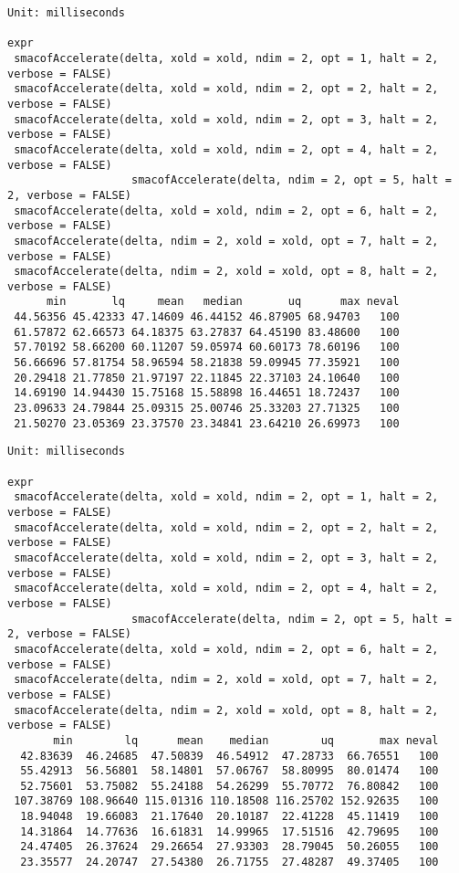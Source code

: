 \documentclass[
  12pt,
  letterpaper,
  DIV=11,
  numbers=noendperiod]{scrartcl}
\begin{document}
\begin{verbatim}
Unit: milliseconds
                                                                                    expr
 smacofAccelerate(delta, xold = xold, ndim = 2, opt = 1, halt = 2,      verbose = FALSE)
 smacofAccelerate(delta, xold = xold, ndim = 2, opt = 2, halt = 2,      verbose = FALSE)
 smacofAccelerate(delta, xold = xold, ndim = 2, opt = 3, halt = 2,      verbose = FALSE)
 smacofAccelerate(delta, xold = xold, ndim = 2, opt = 4, halt = 2,      verbose = FALSE)
                   smacofAccelerate(delta, ndim = 2, opt = 5, halt = 2, verbose = FALSE)
 smacofAccelerate(delta, xold = xold, ndim = 2, opt = 6, halt = 2,      verbose = FALSE)
 smacofAccelerate(delta, ndim = 2, xold = xold, opt = 7, halt = 2,      verbose = FALSE)
 smacofAccelerate(delta, ndim = 2, xold = xold, opt = 8, halt = 2,      verbose = FALSE)
      min       lq     mean   median       uq      max neval
 44.56356 45.42333 47.14609 46.44152 46.87905 68.94703   100
 61.57872 62.66573 64.18375 63.27837 64.45190 83.48600   100
 57.70192 58.66200 60.11207 59.05974 60.60173 78.60196   100
 56.66696 57.81754 58.96594 58.21838 59.09945 77.35921   100
 20.29418 21.77850 21.97197 22.11845 22.37103 24.10640   100
 14.69190 14.94430 15.75168 15.58898 16.44651 18.72437   100
 23.09633 24.79844 25.09315 25.00746 25.33203 27.71325   100
 21.50270 23.05369 23.37570 23.34841 23.64210 26.69973   100
\end{verbatim}

\begin{verbatim}
Unit: milliseconds
                                                                                    expr
 smacofAccelerate(delta, xold = xold, ndim = 2, opt = 1, halt = 2,      verbose = FALSE)
 smacofAccelerate(delta, xold = xold, ndim = 2, opt = 2, halt = 2,      verbose = FALSE)
 smacofAccelerate(delta, xold = xold, ndim = 2, opt = 3, halt = 2,      verbose = FALSE)
 smacofAccelerate(delta, xold = xold, ndim = 2, opt = 4, halt = 2,      verbose = FALSE)
                   smacofAccelerate(delta, ndim = 2, opt = 5, halt = 2, verbose = FALSE)
 smacofAccelerate(delta, xold = xold, ndim = 2, opt = 6, halt = 2,      verbose = FALSE)
 smacofAccelerate(delta, ndim = 2, xold = xold, opt = 7, halt = 2,      verbose = FALSE)
 smacofAccelerate(delta, ndim = 2, xold = xold, opt = 8, halt = 2,      verbose = FALSE)
       min        lq      mean    median        uq       max neval
  42.83639  46.24685  47.50839  46.54912  47.28733  66.76551   100
  55.42913  56.56801  58.14801  57.06767  58.80995  80.01474   100
  52.75601  53.75082  55.24188  54.26299  55.70772  76.80842   100
 107.38769 108.96640 115.01316 110.18508 116.25702 152.92635   100
  18.94048  19.66083  21.17640  20.10187  22.41228  45.11419   100
  14.31864  14.77636  16.61831  14.99965  17.51516  42.79695   100
  24.47405  26.37624  29.26654  27.93303  28.79045  50.26055   100
  23.35577  24.20747  27.54380  26.71755  27.48287  49.37405   100
\end{verbatim}
\end{document}
